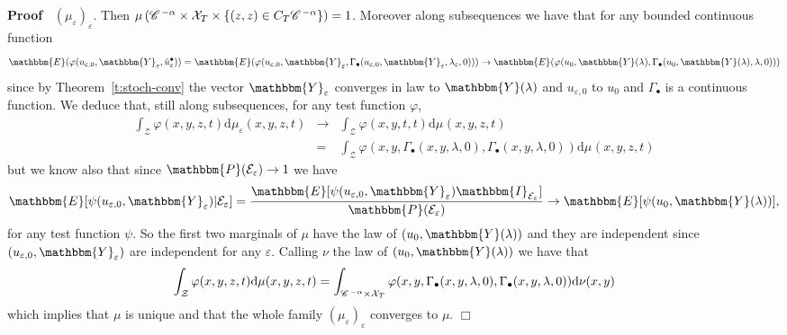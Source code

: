 \documentclass[a4paper,11pt]{article}
\newcommand{\mathd}{\mathrm{d}}
\newenvironment{proof}{\noindent\textbf{Proof\ }}{\hspace*{\fill}$\Box$\medskip}
\newcommand{\CC}{\mathscr{C} \hspace{.1em}}
\begin{document}
\begin{proof}
  $(\mu_{\varepsilon})_{\varepsilon}$. Then $\mu \left( \CC^{- \alpha} \times
  \mathcal{X}_T \times \left\{ (z, z) \in C_T \CC^{- \alpha} \right\} \right)
  = 1$. Moreover along subsequences we have that for any bounded continuous
  function
  \[ \mathbbm{E} (\varphi (u_{\varepsilon, 0}, \mathbbm{Y}_{\varepsilon},
     \tilde{u}_{\varepsilon}^{\bullet})) =\mathbbm{E} (\varphi
     (u_{\varepsilon, 0}, \mathbbm{Y}_{\varepsilon}, \Gamma_{\bullet}
     (u_{\varepsilon, 0}, \mathbbm{Y}_{\varepsilon}, \lambda_{\varepsilon},
     0))) \rightarrow \mathbbm{E} (\varphi (u_0, \mathbbm{Y} (\lambda),
     \Gamma_{\bullet} (u_0, \mathbbm{Y} (\lambda), \lambda, 0))) \]
  since by Theorem~\ref{t:stoch-conv} the vector $\mathbbm{Y}_{\varepsilon}$
  converges in law to $\mathbbm{Y} (\lambda)$ and $u_{\varepsilon, 0}$ to
  $u_0$ and $\Gamma_{\bullet}$ is a continuous function. We deduce that, still
  along subsequences, for any test function $\varphi$,
    \begin{eqnarray*}
  \int_{\mathcal{Z}} \varphi (x, y, z, t) \mathd \mu_{\varepsilon} (x, y,
     z, t) & \rightarrow & \int_{\mathcal{Z}} \varphi (x, y, t, t) \mathd \mu_{}
     (x, y, z, t) \\ & =  &\int_{\mathcal{Z}} \varphi (x, y, \Gamma_{\bullet} (x, y,
     \lambda, 0), \Gamma_{\bullet} (x, y, \lambda, 0)) \mathd \mu_{} (x, y, z,
     t)  \end{eqnarray*}
  but we know also that since $\mathbbm{P} (\mathcal{E}_{\varepsilon})
  \rightarrow 1$ we have
  \[ \mathbbm{E} [\psi (u_{\varepsilon, 0}, \mathbbm{Y}_{\varepsilon})
     |\mathcal{E}_{\varepsilon}] = \frac{\mathbbm{E} [\psi (u_{\varepsilon,
     0}, \mathbbm{Y}_{\varepsilon})
     \mathbbm{I}_{\mathcal{E}_{\varepsilon}}]}{\mathbbm{P}
     (\mathcal{E}_{\varepsilon})} \rightarrow \mathbbm{E} [\psi (u_0,
     \mathbbm{Y} (\lambda))], \]
  for any test function $\psi$. So the first two marginals of $\mu$ have the
  law of $(u_0, \mathbbm{Y} (\lambda))$ and they are independent since
  $(u_{\varepsilon, 0}, \mathbbm{Y}_{\varepsilon})$ are independent for any
  $\varepsilon$. Calling $\nu$ the law of $(u_0, \mathbbm{Y} (\lambda))$ we
  have that
  \[ \int_{\mathcal{Z}} \varphi (x, y, z, t) \mathd \mu (x, y, z, t) =
     \int_{\CC^{- \alpha} \times \mathcal{X}_T} \varphi (x, y,
     \Gamma_{\bullet} (x, y, \lambda, 0), \Gamma_{\bullet} (x, y, \lambda, 0))
     \mathd \nu_{} (x, y) \]
  which implies that $\mu$ is unique and that the whole family
  $(\mu_{\varepsilon})_{\varepsilon}$ converges to $\mu$.
\end{proof}
\end{document}
